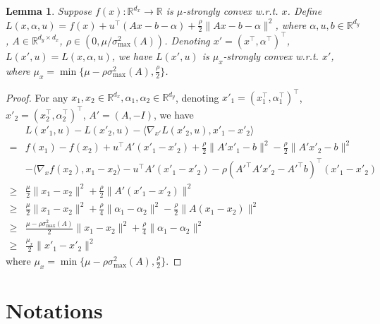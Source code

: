 \documentclass{article}
\def\R{\mathbb{R}}
\theoremstyle{plain}
\newtheorem{lemma}[theorem]{Lemma}
\theoremstyle{definition}
\theoremstyle{remark}
\begin{document}
\begin{lemma}\label{lemma: sc}
    Suppose $f(x): \R^{d_x}\to \R$ is $\mu$-strongly convex w.r.t. $x$. Define $L(x, \alpha, u)=f(x)+u^\top(Ax-b-\alpha)+\frac{\rho}{2}\|Ax-b-\alpha\|^2$, where $\alpha,u,b\in\R^{d_y}$, $A\in\R^{d_y\times d_x}$, $\rho\in(0,\mu/\sigma^2_{\max}(A))$. Denoting  $x'=(x^\top, \alpha^\top)^\top$, $L(x', u)=L(x,\alpha,u)$, we have $L(x',u)$ is $\mu_x$-strongly convex w.r.t. $x'$, where $\mu_x=\min\{\mu-\rho\sigma_{\max}^2(A), \frac{\rho}{2}\}$.
\end{lemma}


\begin{proof}

For any $x_1, x_2\in\R^{d_x}, \alpha_1, \alpha_2\in\R^{d_y}$, denoting $x'_1=(x_1^\top, \alpha_1^\top)^\top$, $x'_2=(x_2^\top, \alpha_2^\top)^\top$, $A'=(A, -I)$, we have
\begin{align*}
    &L(x'_1,u)-L(x'_2,u)-\langle\nabla_{x'} L(x'_2, u), x'_1-x'_2\rangle\\
    =&f(x_1)-f(x_2)+u^\top A'(x'_1-x'_2)+\frac{\rho}{2}\|A'x'_1-b\|^2-\frac{\rho}{2}\|A'x'_2-b\|^2\\
    &-\langle\nabla_x f(x_2), x_1-x_2 \rangle-u^\top A'(x'_1-x'_2)-\rho(A'^\top A'x'_2-A'^\top b)^\top(x'_1-x'_2)\\
    \geq&\frac{\mu}{2}\|x_1-x_2\|^2+\frac{\rho}{2}\|A'(x'_1-x'_2)\|^2\\
    \geq&\frac{\mu}{2}\|x_1-x_2\|^2+\frac{\rho}{4}\|\alpha_1-\alpha_2\|^2-\frac{\rho}{2}\|A(x_1-x_2)\|^2\\
    \geq& \frac{\mu-\rho\sigma_{\max}^2(A)}{2}\|x_1-x_2\|^2+\frac{\rho}{4}\|\alpha_1-\alpha_2\|^2\\
    \geq&\frac{\mu_x}{2}\|x'_1-x'_2\|^2
\end{align*}
where $\mu_x=\min\{\mu-\rho\sigma_{\max}^2(A), \frac{\rho}{2}\}$.
\end{proof}



\section{Notations}\label{app: notations}
\end{document}

